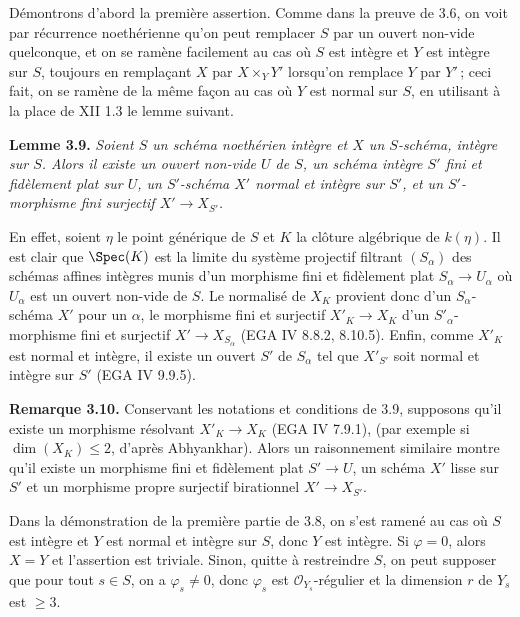 D\'emontrons d'abord la premi\`ere assertion. Comme dans la preuve de 3.6, on voit par r\'ecurrence noeth\'erienne qu'on peut remplacer \(S\) par un ouvert non-vide quelconque, et on se ram\`ene facilement au cas o\`u \(S\) est int\`egre et \(Y\) est int\`egre sur \(S\), toujours en rempla\c{c}ant \(X\) par \(X\times_YY'\) lorsqu'on remplace \(Y\) par \(Y'\)\,; ceci fait, on se ram\`ene de la m\^eme fa\c{c}on au cas o\`u \(Y\) est normal sur \(S\), en utilisant \`a la place de XII 1.3 le lemme suivant.

\textbf{Lemme 3.9.} \emph{Soient \(S\) un sch\'ema noeth\'erien int\`egre et \(X\) un \(S\)-sch\'ema, int\`egre sur \(S\). Alors il existe un ouvert non-vide \(U\) de \(S\), un sch\'ema int\`egre \(S'\) fini et fid\`element plat sur \(U\), un \(S'\)-sch\'ema \(X'\) normal et int\`egre sur \(S'\), et un \(S'\)-morphisme fini surjectif \(X'\to X_{S'}\).}

En
effet, soient \(\eta\) le point g\'en\'erique de \(S\) et \(K\) la cl\^oture alg\'ebrique de \(k(\eta)\). Il est clair que \(\Spec(K)\) est la limite du syst\`eme projectif filtrant \((S_\alpha)\) des sch\'emas affines int\`egres munis d'un morphisme fini et fid\`element plat \(S_\alpha\to U_\alpha\) o\`u \(U_\alpha\) est un ouvert non-vide de \(S\). Le normalis\'e de \(X_K\) provient donc d'un \(S_\alpha\)-sch\'ema \(X'\) pour un \(\alpha\), le morphisme fini et surjectif \(X'_K\to X_K\) d'un \(S'_\alpha\)-morphisme fini et surjectif \(X'\to X_{S_\alpha}\) (EGA IV 8.8.2, 8.10.5). Enfin, comme \(X'_K\) est normal et int\`egre, il existe un ouvert \(S'\) de \(S_\alpha\) tel que \(X'_{S'}\) soit normal et int\`egre sur \(S'\) (EGA IV 9.9.5).

\textbf{Remarque 3.10.} Conservant les notations et conditions de 3.9, supposons qu'il existe un morphisme r\'esolvant \(X'_K\to X_K\) (EGA IV 7.9.1), (par exemple si \(\dim(X_K)\le2\), d'apr\`es Abhyankhar). Alors un raisonnement similaire montre qu'il existe un morphisme fini et fid\`element plat \(S'\to U\), un sch\'ema \(X'\) lisse sur \(S'\) et un morphisme propre surjectif birationnel \(X'\to X_{S'}\).

Dans la d\'emonstration de la premi\`ere partie de 3.8, on s'est ramen\'e au cas o\`u \(S\) est int\`egre et \(Y\) est normal et int\`egre sur \(S\), donc \(Y\) est int\`egre. Si \(\varphi=0\), alors \(X=Y\) et l'assertion est triviale. Sinon, quitte \`a restreindre \(S\), on peut supposer que pour tout \(s\in S\), on a \(\varphi_s\ne0\), donc \(\varphi_s\) est \(\mathcal O_{Y_s}\)-r\'egulier et la dimension \(r\) de \(Y_s\) est \(\ge3\).

